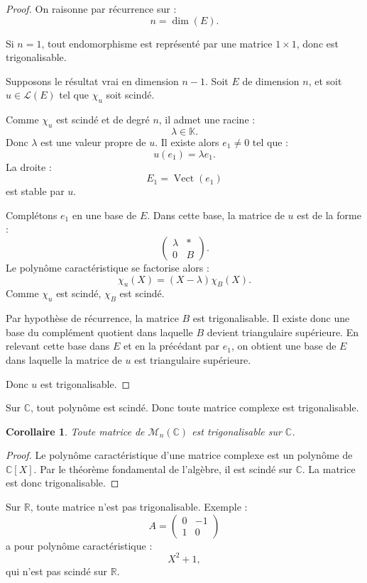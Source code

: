 \documentclass[11pt,a4paper]{article}
\newcommand{\K}{\mathbb K}
\newcommand{\R}{\mathbb R}
\newcommand{\C}{\mathbb C}
\newcommand{\M}{\mathcal M}
\newcommand{\Lcal}{\mathcal L}
\newcommand{\Vect}{\operatorname{Vect}}
\newtheorem{corollaire}[prop]{Corollaire}
\begin{document}
\begin{proof}
On raisonne par récurrence sur :
\[
n=\dim(E).
\]

Si \(n=1\), tout endomorphisme est représenté par une matrice \(1\times1\), donc est trigonalisable.

Supposons le résultat vrai en dimension \(n-1\).  
Soit \(E\) de dimension \(n\), et soit \(u\in\Lcal(E)\) tel que \(\chi_u\) soit scindé.

Comme \(\chi_u\) est scindé et de degré \(n\), il admet une racine :
\[
\lambda\in\K.
\]
Donc \(\lambda\) est une valeur propre de \(u\).  
Il existe alors \(e_1\neq0\) tel que :
\[
u(e_1)=\lambda e_1.
\]
La droite :
\[
E_1=\Vect(e_1)
\]
est stable par \(u\).

Complétons \(e_1\) en une base de \(E\).  
Dans cette base, la matrice de \(u\) est de la forme :
\[
\begin{pmatrix}
\lambda&*\\
0&B
\end{pmatrix}.
\]
Le polynôme caractéristique se factorise alors :
\[
\chi_u(X)=(X-\lambda)\chi_B(X).
\]
Comme \(\chi_u\) est scindé, \(\chi_B\) est scindé.

Par hypothèse de récurrence, la matrice \(B\) est trigonalisable.  
Il existe donc une base du complément quotient dans laquelle \(B\) devient triangulaire supérieure.  
En relevant cette base dans \(E\) et en la précédant par \(e_1\), on obtient une base de \(E\) dans laquelle la matrice de \(u\) est triangulaire supérieure.

Donc \(u\) est trigonalisable.
\end{proof}

\begin{retenirbox}
Sur \(\C\), tout polynôme est scindé.  
Donc toute matrice complexe est trigonalisable.
\end{retenirbox}

\begin{corollaire}
Toute matrice de \(\M_n(\C)\) est trigonalisable sur \(\C\).
\end{corollaire}

\begin{proof}
Le polynôme caractéristique d'une matrice complexe est un polynôme de \(\C[X]\).  
Par le théorème fondamental de l'algèbre, il est scindé sur \(\C\).  
La matrice est donc trigonalisable.
\end{proof}

\begin{erreurbox}
Sur \(\R\), toute matrice n'est pas trigonalisable.  
Exemple :
\[
A=
\begin{pmatrix}
0&-1\\
1&0
\end{pmatrix}
\]
a pour polynôme caractéristique :
\[
X^2+1,
\]
qui n'est pas scindé sur \(\R\).
\end{erreurbox}
\end{document}
